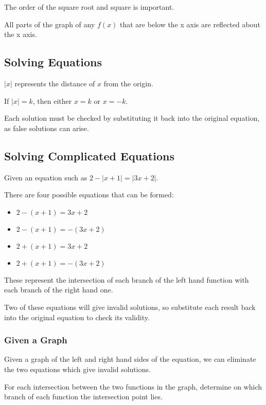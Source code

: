 \documentclass[a4paper,11pt]{report}
\begin{document}
The order of the square root and square is important.

All parts of the graph of any $f(x)$ that are below the x axis are reflected
about the x axis.

\subsection{Solving Equations}

$\lvert x \rvert$ represents the distance of $x$ from the origin.

If $\lvert x \rvert = k$, then either $x = k$ or $x = -k$.

Each solution must be checked by substituting it back into the original
equation, as false solutions can arise.

\subsection{Solving Complicated Equations}

Given an equation such as $2 - \lvert x + 1 \rvert = \lvert 3x + 2 \rvert$.

There are four possible equations that can be formed:

\begin{itemize}
\item $2 - (x + 1) = 3x + 2$
\item $2 - (x + 1) = -(3x + 2)$
\item $2 + (x + 1) = 3x + 2$
\item $2 + (x + 1) = -(3x + 2)$
\end{itemize}

These represent the intersection of each branch of the left hand function with
each branch of the right hand one.

Two of these equations will give invalid solutions, so substitute each result
back into the original equation to check its validity.

\subsubsection{Given a Graph}

Given a graph of the left and right hand sides of the equation, we can eliminate
the two equations which give invalid solutions.

For each intersection between the two functions in the graph, determine on which
branch of each function the intersection point lies.
\end{document}
